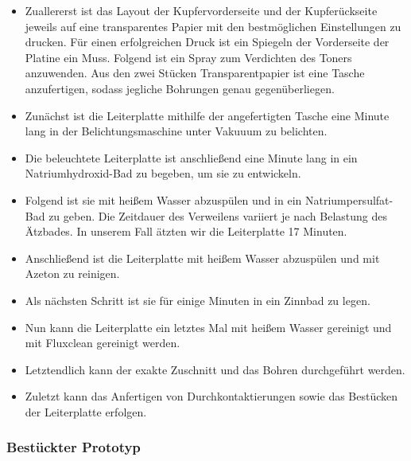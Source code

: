 \begin{itemize}
\item Zuallererst ist das Layout der Kupfervorderseite und der Kupferückseite jeweils auf eine transparentes Papier mit den bestmöglichen Einstellungen zu drucken.
Für einen erfolgreichen Druck ist ein Spiegeln der Vorderseite der Platine ein Muss.
Folgend ist ein Spray zum Verdichten des Toners anzuwenden.
Aus den zwei Stücken Transparentpapier ist eine Tasche anzufertigen, sodass jegliche Bohrungen genau gegenüberliegen. \\

\item Zunächst ist die Leiterplatte mithilfe der angefertigten Tasche eine Minute lang in der Belichtungsmaschine unter Vakuuum zu belichten. \\

\item Die beleuchtete Leiterplatte ist anschließend eine Minute lang in ein Natriumhydroxid-Bad zu begeben, um sie zu entwickeln. \\

\item Folgend ist sie mit heißem Wasser abzuspülen und in ein Natriumpersulfat-Bad zu geben.
Die Zeitdauer des Verweilens variiert je nach Belastung des Ätzbades.
In unserem Fall ätzten wir die Leiterplatte 17 Minuten. \\

\item Anschließend ist die Leiterplatte mit heißem Wasser abzuspülen und mit Azeton zu reinigen. \\

\item Als nächsten Schritt ist sie für einige Minuten in ein Zinnbad zu legen. \\

\item Nun kann die Leiterplatte ein letztes Mal mit heißem Wasser gereinigt und mit Fluxclean gereinigt werden.

\item Letztendlich kann der exakte Zuschnitt und das Bohren durchgeführt werden. \\

\item Zuletzt kann das Anfertigen von Durchkontaktierungen sowie das Bestücken der Leiterplatte erfolgen.
\end{itemize}

\subsubsection{Bestückter Prototyp}


